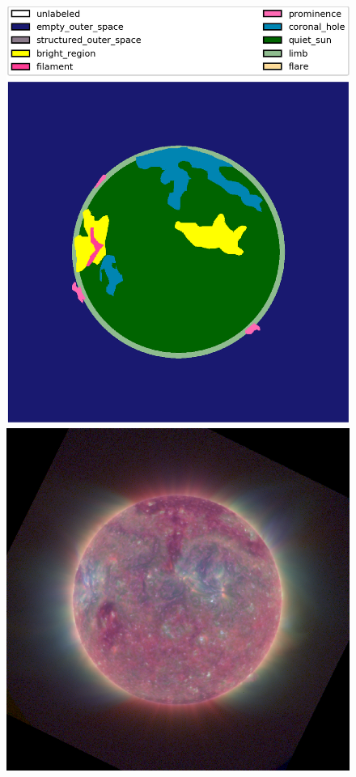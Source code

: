 \documentclass[twoside]{report}
\begin{document}
\begin{figure}[H]
  \begin{center}
    \includegraphics[scale=0.1]{g20171015000202-0}
    \includegraphics[scale=0.35]{g20171015000202}

\end{center}
\end{figure}
\end{document}
